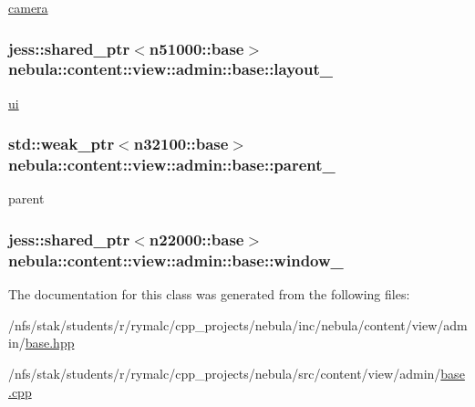 \hyperlink{classnebula_1_1content_1_1camera}{camera} \hypertarget{classnebula_1_1content_1_1view_1_1admin_1_1base_a4b4b7828544d4b7bdf60ff77e4f19d40}{
\subsubsection[{layout\_\-}]{\setlength{\rightskip}{0pt plus 5cm}jess::shared\_\-ptr$<${\bf n51000::base}$>$ {\bf nebula::content::view::admin::base::layout\_\-}}}
\label{classnebula_1_1content_1_1view_1_1admin_1_1base_a4b4b7828544d4b7bdf60ff77e4f19d40}


\hyperlink{namespacenebula_1_1ui}{ui} \hypertarget{classnebula_1_1content_1_1view_1_1admin_1_1base_a138792f8feeb7b9a84b83ccf2a7c5948}{
\subsubsection[{parent\_\-}]{\setlength{\rightskip}{0pt plus 5cm}std::weak\_\-ptr$<${\bf n32100::base}$>$ {\bf nebula::content::view::admin::base::parent\_\-}}}
\label{classnebula_1_1content_1_1view_1_1admin_1_1base_a138792f8feeb7b9a84b83ccf2a7c5948}


parent \hypertarget{classnebula_1_1content_1_1view_1_1admin_1_1base_a4e7dd25a9c5f6868f98598668cb0d330}{
\subsubsection[{window\_\-}]{\setlength{\rightskip}{0pt plus 5cm}jess::shared\_\-ptr$<${\bf n22000::base}$>$ {\bf nebula::content::view::admin::base::window\_\-}}}
\label{classnebula_1_1content_1_1view_1_1admin_1_1base_a4e7dd25a9c5f6868f98598668cb0d330}


The documentation for this class was generated from the following files:\begin{DoxyCompactItemize}
\item 
/nfs/stak/students/r/rymalc/cpp\_\-projects/nebula/inc/nebula/content/view/admin/\hyperlink{inc_2nebula_2content_2view_2admin_2base_8hpp}{base.hpp}\item 
/nfs/stak/students/r/rymalc/cpp\_\-projects/nebula/src/content/view/admin/\hyperlink{src_2content_2view_2admin_2base_8cpp}{base.cpp}\end{DoxyCompactItemize}
